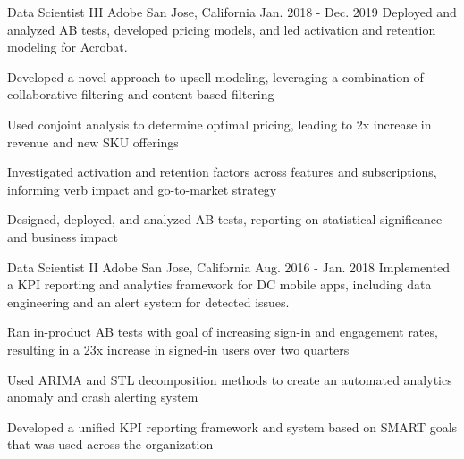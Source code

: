 \begin{cventries}
\cventry
    {Data Scientist III} %
    {Adobe} %
    {San Jose, California} %
    {Jan. 2018 - Dec. 2019} %
    {Deployed and analyzed AB tests, developed pricing models, and led activation and retention modeling for Acrobat.} %
    {
      \begin{cvitems} %
        \item {Developed a novel approach to upsell modeling, leveraging a combination of collaborative filtering and content-based filtering}
        \item {Used conjoint analysis to determine optimal pricing, leading to 2x increase in revenue and new SKU offerings}
        \item {Investigated activation and retention factors across features and subscriptions, informing verb impact and go-to-market strategy}
        \item {Designed, deployed, and analyzed AB tests, reporting on statistical significance and business impact}
      \end{cvitems}
    }

\cventry
    {Data Scientist II} %
    {Adobe} %
    {San Jose, California} %
    {Aug. 2016 - Jan. 2018} %
    {Implemented a KPI reporting and analytics framework for DC mobile apps, including data engineering and an alert system for detected issues.} %
    {
      \begin{cvitems} %
        \item {Ran in-product AB tests with goal of increasing sign-in and engagement rates, resulting in a 23x increase in signed-in users over two quarters}
        \item {Used ARIMA and STL decomposition methods to create an automated analytics anomaly and crash alerting system}
        \item {Developed a unified KPI reporting framework and system based on SMART goals that was used across the organization}
      \end{cvitems}
    }

\end{cventries}
